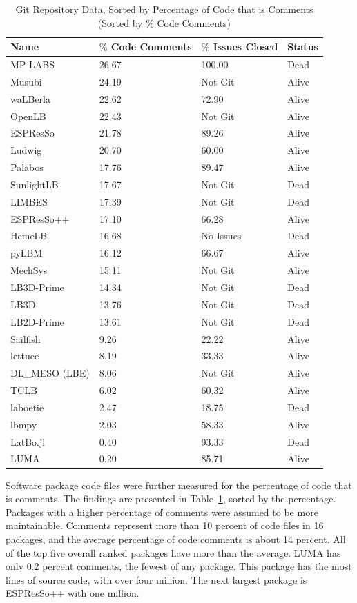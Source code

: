 \documentclass[final, 3p, times, authoryear]{elsarticle}
\begin{document}
\begin{table}[ht!]
	\begin{center}
		\begin{tabular}{ p{3.5cm}p{3.5cm}p{3.5cm}p{2.5cm} }
			\toprule
			Name & $\%$ Code Comments & $\%$ Issues Closed & Status\\
			\midrule
			MP-LABS & 26.67 & 100.00 & Dead\\
			Musubi & 24.19 & Not Git & Alive\\
			waLBerla & 22.62 & 72.90 & Alive\\
			OpenLB & 22.43 & Not Git & Alive\\
			ESPResSo & 21.78 & 89.26 & Alive\\
			Ludwig& 20.70 & 60.00 & Alive\\
			Palabos & 17.76 & 89.47 & Alive\\
			SunlightLB & 17.67 & Not Git & Dead\\
			LIMBES & 17.39 & Not Git & Dead\\
			ESPResSo++ & 17.10 & 66.28 & Alive\\
			HemeLB & 16.68 & No Issues & Dead\\
			pyLBM & 16.12 & 66.67 & Alive\\
			MechSys & 15.11 & Not Git & Alive\\
			LB3D-Prime & 14.34 & Not Git & Dead\\
			LB3D & 13.76 & Not Git & Dead\\
			LB2D-Prime & 13.61 & Not Git & Dead\\
			Sailfish & 9.26 & 22.22 & Alive\\
			lettuce & 8.19 & 33.33 & Alive\\
			DL\_MESO (LBE) & 8.06 & Not Git & Alive\\
			TCLB & 6.02 & 60.32 & Alive\\
			laboetie & 2.47 & 18.75 & Dead\\	
			lbmpy& 2.03 & 58.33 & Alive\\	
			LatBo.jl & 0.40 & 93.33 & Dead\\
			LUMA& 0.20 & 85.71 & Alive\\
			\bottomrule
		\end{tabular}
		\caption{Git Repository Data, Sorted by Percentage of Code that is
			Comments (Sorted by $\%$ Code Comments)} \label{gitrepodata}
	\end{center}
\end{table}
		
Software package code files were further measured for the percentage of code
that is comments. The findings are presented in Table~\ref{gitrepodata}, sorted
by the percentage. Packages with a higher percentage of comments were assumed to
be more maintainable. Comments represent more than 10 percent of code files in
16 packages, and the average percentage of code comments is about 14 percent.
All of the top five overall ranked packages have more than the average. LUMA has
only 0.2 percent comments, the fewest of any package. This package has the most
lines of source code, with over four million. The next largest package is
ESPResSo++ with one million.
\end{document}
